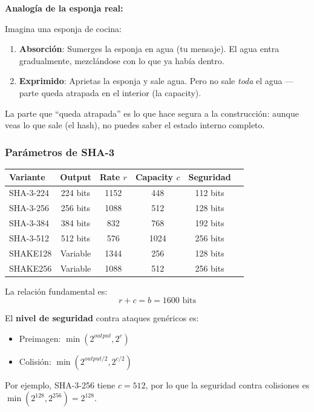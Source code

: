 \documentclass[11pt,a4paper,twoside,openright]{book}
\theoremstyle{definition}
\theoremstyle{plain}
\theoremstyle{remark}
\begin{document}
\begin{intuicion}
\textbf{Analogía de la esponja real:}

Imagina una esponja de cocina:
\begin{enumerate}
    \item \textbf{Absorción}: Sumerges la esponja en agua (tu mensaje). El agua entra gradualmente, mezclándose con lo que ya había dentro.
    \item \textbf{Exprimido}: Aprietas la esponja y sale agua. Pero no sale \textit{toda} el agua --- parte queda atrapada en el interior (la capacity).
\end{enumerate}

La parte que ``queda atrapada'' es lo que hace segura a la construcción: aunque veas lo que sale (el hash), no puedes saber el estado interno completo.
\end{intuicion}

\subsubsection{Parámetros de SHA-3}

\begin{center}
\begin{tabular}{lccccc}
\toprule
\textbf{Variante} & \textbf{Output} & \textbf{Rate $r$} & \textbf{Capacity $c$} & \textbf{Seguridad} \\
\midrule
SHA-3-224 & 224 bits & 1152 & 448 & 112 bits \\
SHA-3-256 & 256 bits & 1088 & 512 & 128 bits \\
SHA-3-384 & 384 bits & 832 & 768 & 192 bits \\
SHA-3-512 & 512 bits & 576 & 1024 & 256 bits \\
\midrule
SHAKE128 & Variable & 1344 & 256 & 128 bits \\
SHAKE256 & Variable & 1088 & 512 & 256 bits \\
\bottomrule
\end{tabular}
\end{center}

\begin{mathnote}
La relación fundamental es:
\[ r + c = b = 1600 \text{ bits} \]

El \textbf{nivel de seguridad} contra ataques genéricos es:
\begin{itemize}
    \item Preimagen: $\min(2^{output}, 2^c)$
    \item Colisión: $\min(2^{output/2}, 2^{c/2})$
\end{itemize}

Por ejemplo, SHA-3-256 tiene $c = 512$, por lo que la seguridad contra colisiones es $\min(2^{128}, 2^{256}) = 2^{128}$.
\end{mathnote}
\end{document}
